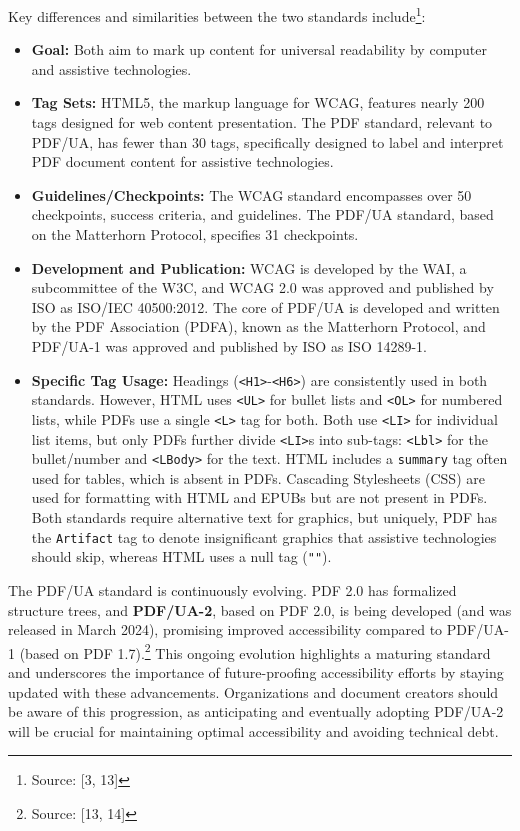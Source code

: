 Key differences and similarities between the two standards include\footnote{Source: [3, 13]}:
\begin{itemize}[noitemsep,topsep=0pt]
    \item \textbf{Goal:} Both aim to mark up content for universal readability by computer and assistive technologies.
    \item \textbf{Tag Sets:} HTML5, the markup language for WCAG, features nearly 200 tags designed for web content presentation. The PDF standard, relevant to PDF/UA, has fewer than 30 tags, specifically designed to label and interpret PDF document content for assistive technologies.
    \item \textbf{Guidelines/Checkpoints:} The WCAG standard encompasses over 50 checkpoints, success criteria, and guidelines. The PDF/UA standard, based on the Matterhorn Protocol, specifies 31 checkpoints.
    \item \textbf{Development and Publication:} WCAG is developed by the WAI, a subcommittee of the W3C, and WCAG 2.0 was approved and published by ISO as ISO/IEC 40500:2012. The core of PDF/UA is developed and written by the PDF Association (PDFA), known as the Matterhorn Protocol, and PDF/UA-1 was approved and published by ISO as ISO 14289-1.
    \item \textbf{Specific Tag Usage:} Headings (\texttt{<H1>}-\texttt{<H6>}) are consistently used in both standards. However, HTML uses \texttt{<UL>} for bullet lists and \texttt{<OL>} for numbered lists, while PDFs use a single \texttt{<L>} tag for both. Both use \texttt{<LI>} for individual list items, but only PDFs further divide \texttt{<LI>}s into sub-tags: \texttt{<Lbl>} for the bullet/number and \texttt{<LBody>} for the text. HTML includes a \texttt{summary} tag often used for tables, which is absent in PDFs. Cascading Stylesheets (CSS) are used for formatting with HTML and EPUBs but are not present in PDFs. Both standards require alternative text for graphics, but uniquely, PDF has the \texttt{Artifact} tag to denote insignificant graphics that assistive technologies should skip, whereas HTML uses a null tag (\texttt{""}).
\end{itemize}

The PDF/UA standard is continuously evolving. PDF 2.0 has formalized structure trees, and \textbf{PDF/UA-2}, based on PDF 2.0, is being developed (and was released in March 2024), promising improved accessibility compared to PDF/UA-1 (based on PDF 1.7).\footnote{Source: [13, 14]} This ongoing evolution highlights a maturing standard and underscores the importance of future-proofing accessibility efforts by staying updated with these advancements. Organizations and document creators should be aware of this progression, as anticipating and eventually adopting PDF/UA-2 will be crucial for maintaining optimal accessibility and avoiding technical debt.

